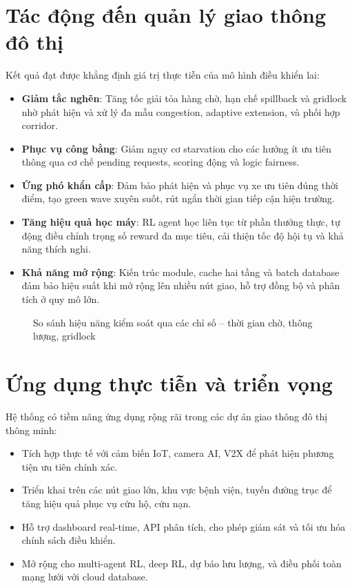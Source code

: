 \section{Tác động đến quản lý giao thông đô thị}

Kết quả đạt được khẳng định giá trị thực tiễn của mô hình điều khiển lai:

\begin{itemize}
    \item \textbf{Giảm tắc nghẽn}: Tăng tốc giải tỏa hàng chờ, hạn chế spillback và gridlock nhờ phát hiện và xử lý đa mẫu congestion, adaptive extension, và phối hợp corridor.
    \item \textbf{Phục vụ công bằng}: Giảm nguy cơ starvation cho các hướng ít ưu tiên thông qua cơ chế pending requests, scoring động và logic fairness.
    \item \textbf{Ứng phó khẩn cấp}: Đảm bảo phát hiện và phục vụ xe ưu tiên đúng thời điểm, tạo green wave xuyên suốt, rút ngắn thời gian tiếp cận hiện trường.
    \item \textbf{Tăng hiệu quả học máy}: RL agent học liên tục từ phần thưởng thực, tự động điều chỉnh trọng số reward đa mục tiêu, cải thiện tốc độ hội tụ và khả năng thích nghi.
    \item \textbf{Khả năng mở rộng}: Kiến trúc module, cache hai tầng và batch database đảm bảo hiệu suất khi mở rộng lên nhiều nút giao, hỗ trợ đồng bộ và phân tích ở quy mô lớn.
\end{itemize}

\begin{figure}[H]
    \centering
    \caption{So sánh hiệu năng kiểm soát qua các chỉ số – thời gian chờ, thông lượng, gridlock}
\end{figure}

\section{Ứng dụng thực tiễn và triển vọng}

Hệ thống có tiềm năng ứng dụng rộng rãi trong các dự án giao thông đô thị thông minh:

\begin{itemize}
    \item Tích hợp thực tế với cảm biến IoT, camera AI, V2X để phát hiện phương tiện ưu tiên chính xác.
    \item Triển khai trên các nút giao lớn, khu vực bệnh viện, tuyến đường trục để tăng hiệu quả phục vụ cứu hộ, cứu nạn.
    \item Hỗ trợ dashboard real-time, API phân tích, cho phép giám sát và tối ưu hóa chính sách điều khiển.
    \item Mở rộng cho multi-agent RL, deep RL, dự báo lưu lượng, và điều phối toàn mạng lưới với cloud database.
\end{itemize}

